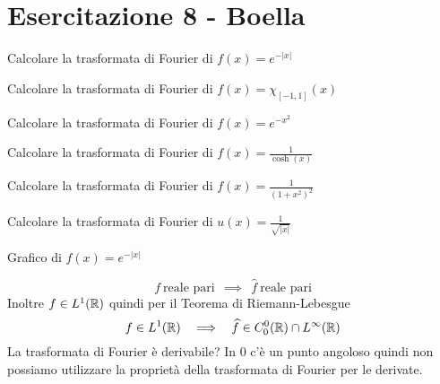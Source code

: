 \chapter{Esercitazione 8 - Boella}
\ParteEsercizi
\Esercizio{}

Calcolare la trasformata di Fourier di $f(x)=e^{-|x|}$
\Esercizio{}

Calcolare la trasformata di Fourier di $f(x)=\chi _{[-1,1]} (x)$
\Esercizio{}

Calcolare la trasformata di Fourier di $f(x)=e^{-x^{2}}$
\Esercizio{}

Calcolare la trasformata di Fourier di $f(x)=\frac{1}{\cosh (x)}$
\Esercizio{}

Calcolare la trasformata di Fourier di $f(x)=\frac{1}{\left( 1+x^{2}\right)^{2}}$
\Esercizio{}

Calcolare la trasformata di Fourier di $u(x)=\frac{1}{\sqrt{|x|}}$

\ParteSoluzioni
\Soluzione

Grafico di $f( x) =e^{-| x| }$

\begin{equation*}
f\ \text{reale pari} \ \ \implies \ \ \hat{f} \ \text{reale pari}
\end{equation*}
Inoltre $f\in L^{1}(\mathbb{R} )$ quindi per il Teorema di Riemann-Lebesgue
\begin{equation*}
f\in L^{1}(\mathbb{R} ) \ \ \implies \ \ \widehat{f} \in C^{0}_{0}(\mathbb{R} ) \cap L^{\infty }(\mathbb{R} )
\end{equation*}
La trasformata di Fourier è derivabile? In $0$ c'è un punto angoloso quindi non possiamo utilizzare la proprietà della trasformata di Fourier per le derivate.

